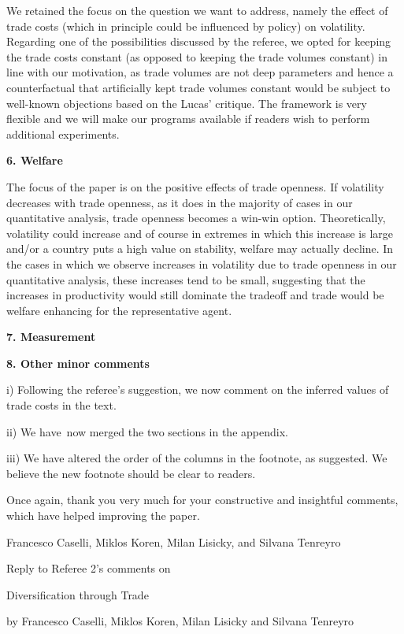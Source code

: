 \documentclass[12pt]{article}
\begin{document}
We retained the focus on the question we want to address, namely the effect
of trade costs (which in principle could be influenced by policy) on
volatility. Regarding one of the possibilities discussed by the referee, we
opted for keeping the trade costs constant (as opposed to keeping the trade
volumes constant) in line with our motivation, as trade volumes are not deep
parameters and hence a counterfactual that artificially kept trade volumes
constant would be subject to well-known objections based on the Lucas'
critique. The framework is very flexible and we will make our programs
available if readers wish to perform additional experiments.\bigskip 

\textbf{6. Welfare}

The focus of the paper is on the positive effects of trade openness. If
volatility decreases with trade openness, as it does in the majority of
cases in our quantitative analysis, trade openness becomes a win-win option.
Theoretically, volatility could increase and of course in extremes in which
this increase is large and/or a country puts a high value on stability,
welfare may actually decline. In the cases in which we observe increases in
volatility due to trade openness in our quantitative analysis, these
increases tend to be small, suggesting that the increases in productivity
would still dominate the tradeoff and trade would be welfare enhancing for
the representative agent.\bigskip

\textbf{7. Measurement}


\bigskip 

\textbf{8. Other minor comments}

i) Following the referee's suggestion, we now comment on the inferred values
of trade costs in the text.

ii) We have\ now merged the two sections in the appendix.

iii) We have altered the order of the columns in the footnote, as suggested.
We believe the new footnote should be clear to readers.\bigskip

Once again, thank you very much for your constructive and insightful
comments, which have helped improving the paper.\medskip \medskip \bigskip

Francesco Caselli, Miklos Koren, Milan Lisicky, and Silvana Tenreyro

\thispagestyle{plain}\pagebreak

\begin{center}
\thispagestyle{plain}\setcounter{page}{1}Reply to Referee 2's comments on

{\Large Diversification through Trade}

by Francesco Caselli, Miklos Koren, Milan Lisicky and Silvana
Tenreyro\medskip

\bigskip
\end{center}
\end{document}
